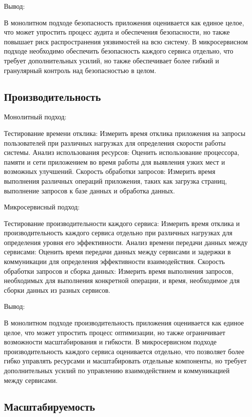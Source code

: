 Вывод:

    В монолитном подходе безопасность приложения оценивается как единое целое, что может упростить процесс аудита и обеспечения безопасности, но также повышает риск распространения уязвимостей на всю систему.
    В микросервисном подходе необходимо обеспечить безопасность каждого сервиса отдельно, что требует дополнительных усилий, но также обеспечивает более гибкий и гранулярный контроль над безопасностью в целом.

\subsection{Производительность}

Монолитный подход:

    Тестирование времени отклика: Измерить время отклика приложения на запросы пользователей при различных нагрузках для определения скорости работы системы.
    Анализ использования ресурсов: Оценить использование процессора, памяти и сети приложением во время работы для выявления узких мест и возможных улучшений.
    Скорость обработки запросов: Измерить время выполнения различных операций приложения, таких как загрузка страниц, выполнение запросов к базе данных и обработка данных.

Микросервисный подход:

    Тестирование производительности каждого сервиса: Измерить время отклика и производительность каждого сервиса отдельно при различных нагрузках для определения уровня его эффективности.
    Анализ времени передачи данных между сервисами: Оценить время передачи данных между сервисами и задержки в коммуникации для определения эффективности взаимодействия.
    Скорость обработки запросов и сборка данных: Измерить время выполнения запросов, необходимых для выполнения конкретной операции, и время, необходимое для сборки данных из разных сервисов.

Вывод:

    В монолитном подходе производительность приложения оценивается как единое целое, что может упростить процесс оптимизации, но также ограничивает возможности масштабирования и гибкости.
    В микросервисном подходе производительность каждого сервиса оценивается отдельно, что позволяет более гибко управлять ресурсами и масштабировать отдельные компоненты, но требует дополнительных усилий по управлению взаимодействием и коммуникацией между сервисами.

\subsection{Масштабируемость}

